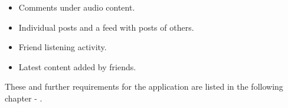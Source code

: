 \begin{itemize}
    \item Comments under audio content.
    \item Individual posts and a feed with posts of others.
    \item Friend listening activity.
    \item Latest content added by friends.
\end{itemize}

These and further requirements for the application are listed in the following chapter - .